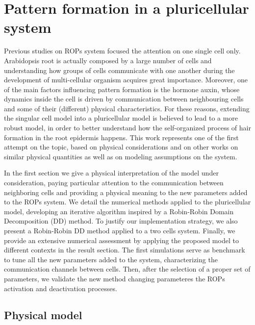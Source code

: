 \chapter{Pattern formation in a pluricellular system}\label{cap:3}
 Previous studies on ROPs system focused the attention on one single cell only. Arabidopsis root is actually composed by a large number of cells and understanding how groups of cells communicate with one another during the development of multi-cellular organism acquires great importance. Moreover, one of the main factors influencing pattern formation is the hormone auxin, whose dynamics inside the cell is driven by communication between neighbouring cells and some of their (different) physical characteristics. For these reasons, extending the singular cell model into a pluricellular model is believed to lead to a more robust model, in order to better understand how the self-organized process of hair formation in the root epidermis happens. This work represents one of the first attempt on the topic, based on physical considerations and on other works on similar physical quantities as well as on modeling assumptions on the system.

 In the first section we give a physical interpretation of the model under consideration, paying particular attention to the communication between neighboring cells and providing a physical meaning to the new parameters added to the ROPs system. We detail the numerical methods applied to the pluricellular model, developing an iterative algorithm inspired by a Robin-Robin Domain Decomposition (DD) method. To justify our implementation strategy, we also present a Robin-Robin DD method applied to a two cells system. Finally, we provide an extensive numerical assessment by applying the proposed model to different contexts in the result section. The first simulations serve as benchmark to tune all the new parameters added to the system, characterizing the communication channels between cells. Then, after the selection of a proper set of parameters, we validate the new method changing parameteres the ROPs activation and deactivation processes.

\section{Physical model}\label{sec:PluriMod}

